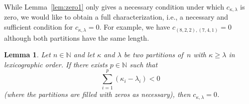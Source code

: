\documentclass[10pt,oneside,american]{amsart}
\numberwithin{equation}{section}
\numberwithin{figure}{section}
\theoremstyle{plain}
\theoremstyle{definition}
\theoremstyle{remark}
\theoremstyle{plain}
\theoremstyle{definition}
\theoremstyle{plain}
\newtheorem{lemma}[thm]{Lemma}
\theoremstyle{plain}
\begin{document}
While Lemma~\ref{lem:zero1} only gives a necessary condition under which
$c_{\kappa,\lambda}$ is zero, we would like to obtain a full characterization,
i.e., a necessary and sufficient condition for $c_{\kappa,\lambda}=0$. For
example, we have $c_{(8,2,2),(7,4,1)} = 0$ although both partitions have the
same length.
\begin{lemma}\label{lem:zero2}
  Let $n\in\mathbb{N}$ and let $\kappa$ and $\lambda$ be two partitions of~$n$
  with $\kappa\geq\lambda$ in lexicographic order. If there exists
  $p\in\mathbb{N}$ such that
  \begin{equation}\label{eq:prop}
    \sum_{i=1}^p (\kappa_i - \lambda_i) < 0
  \end{equation}
  (where the partitions are filled with zeros as necessary), then
  $c_{\kappa,\lambda}=0$.
\end{lemma}
\end{document}
